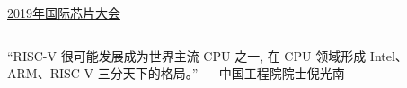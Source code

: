 \begin{frame}{}
\end{frame}

\begin{frame}{}
  \begin{center}
    \href{https://www.benchcouncil.org/conferences/ficc/2019/chips19/chips19.html}{2019年国际芯片大会}
  \end{center}
  \begin{columns}
  \end{columns}

  \vspace{0.60cm}
  \begin{center}
    ``RISC-V 很可能发展成为世界主流 CPU 之一,
    在 CPU 领域形成 Intel、\\[5pt]
    ARM、RISC-V 三分天下的格局。''
    \hfill --- 中国工程院院士\quad 倪光南
  \end{center}
\end{frame}

\begin{frame}{}
  \begin{center}
  \end{center}
  \begin{columns}
  \end{columns}
\end{frame}

